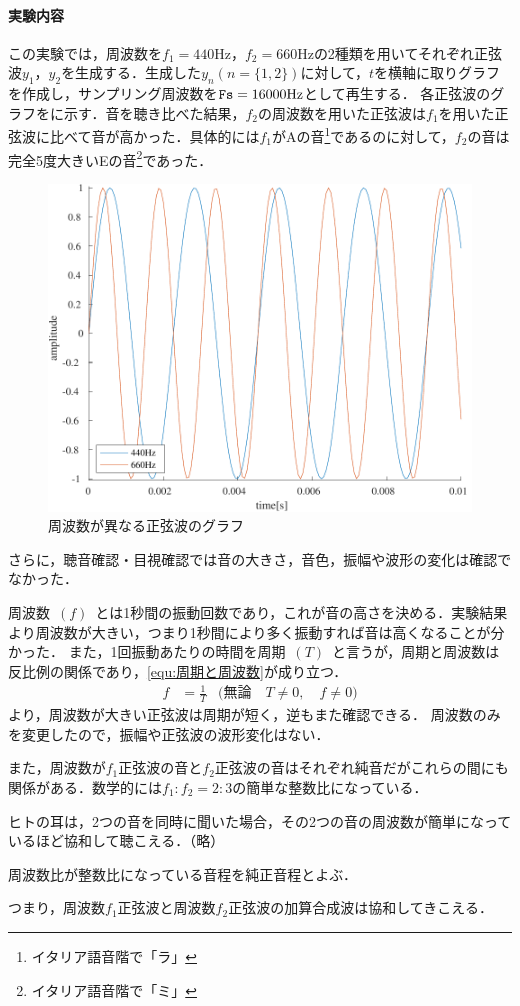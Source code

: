\paragraph{実験内容}この実験では，周波数を\(f_1=440\textrm{Hz}\)，\(f_2=660\textrm{Hz}\)の2種類を用いてそれぞれ正弦波\(y_1\)，\(y_2\)を生成する．生成した\(y_n(n=\{1,2\})\)に対して，\(t\)を横軸に取りグラフを作成し，サンプリング周波数を\(\textrm{\texttt{Fs}}=16000\textrm{Hz}\)として再生する．
\result
各正弦波のグラフをに示す．音を聴き比べた結果，\(f_2\)の周波数を用いた正弦波は\(f_1\)を用いた正弦波に比べて音が高かった．具体的には\(f_1\)がAの音\footnote{イタリア語音階で「ラ」}であるのに対して，\(f_2\)の音は完全5度大きいEの音\footnote{イタリア語音階で「ミ」}であった．
\begin{figure}
    \includegraphics[keepaspectratio,width=.3\textwidth]{../../Figures/01_01.pdf}
    \caption{周波数が異なる正弦波のグラフ}
    \label{fig:\kadaiaa}
\end{figure}
さらに，聴音確認・目視確認では音の大きさ，音色，振幅や波形の変化は確認でなかった．\par
\consideration 周波数\ \((f)\)\ とは1秒間の振動回数であり，これが音の高さを決める．実験結果より周波数が大きい，つまり1秒間により多く振動すれば音は高くなることが分かった．
また，1回振動あたりの時間を周期\ \((T)\)\ と言うが，周期と周波数は反比例の関係であり，\eqref{equ:周期と周波数}が成り立つ．
\begin{align}
    f & =\frac{1}{T} & \big(\textrm{無論}\quad T\neq 0,\quad f\neq 0\big)\label{equ:周期と周波数}
\end{align}
より，周波数が大きい正弦波は周期が短く，逆もまた確認できる．
周波数のみを変更したので，振幅や正弦波の波形変化はない．\par
また，周波数が\(f_1\)正弦波の音と\(f_2\)正弦波の音はそれぞれ純音だがこれらの間にも関係がある．数学的には\(f_1:f_2=2:3\)の簡単な整数比になっている．
\begin{leftbar}
    ヒトの耳は，2つの音を同時に聞いた場合，その2つの音の周波数が簡単になっているほど協和して聴こえる．（略）\par
    周波数比が整数比になっている音程を純正音程とよぶ．\hfill{\cite[p.46,p.47]{音響工学理論基礎}}
\end{leftbar}
つまり，周波数\(f_1\)正弦波と周波数\(f_2\)正弦波の加算合成波は協和してきこえる．

